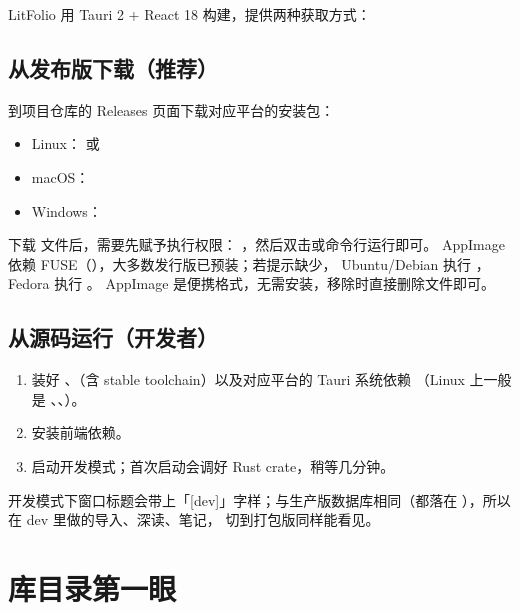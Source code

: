 LitFolio 用 Tauri 2 + React 18 构建，提供两种获取方式：

\subsection{从发布版下载（推荐）}

到项目仓库的 Releases 页面下载对应平台的安装包：

\begin{itemize}
  \item Linux： 或 
  \item macOS：
  \item Windows：
\end{itemize}

\begin{tipbox}
下载  文件后，需要先赋予执行权限：
，然后双击或命令行运行即可。
AppImage 依赖 FUSE（），大多数发行版已预装；若提示缺少，
Ubuntu/Debian 执行 ，
Fedora 执行 。
AppImage 是便携格式，无需安装，移除时直接删除文件即可。
\end{tipbox}

\subsection{从源码运行（开发者）}

\begin{enumerate}
  \item 装好 、（含 stable toolchain）以及对应平台的 Tauri 系统依赖
    （Linux 上一般是 、、）。
  \item {} 安装前端依赖。
  \item {} 启动开发模式；首次启动会调好 Rust crate，稍等几分钟。
\end{enumerate}

\begin{tipbox}
开发模式下窗口标题会带上「[dev]」字样；与生产版数据库相同（都落在
），所以在 dev 里做的导入、深读、笔记，
切到打包版同样能看见。
\end{tipbox}

\section{库目录第一眼}


